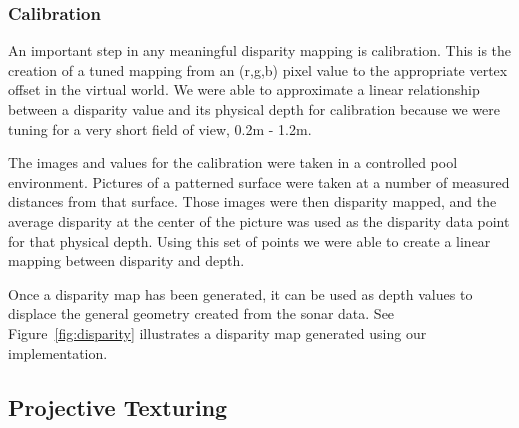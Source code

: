 \documentclass[a4paper,twoside]{article}
\begin{document}
\subsubsection{Calibration}
\label{subsec:calibration}

An important step in any meaningful disparity mapping is calibration.
This is the creation of a tuned mapping from an (r,g,b) pixel value to the appropriate vertex offset in the virtual world. 
We were able to approximate a linear relationship between a disparity value and its physical depth for calibration because we were tuning for a very short field of view, 0.2m - 1.2m.

The images and values for the calibration were taken in a controlled pool environment.  
Pictures of a patterned surface were taken at a number of measured distances from that surface. 
Those images were then disparity mapped, and the average disparity at the center of the picture was used as the disparity data point for that physical depth.
Using this set of points we were able to create a linear mapping between disparity and depth.


Once a disparity map has been generated, it can be used as depth values to displace the general geometry created from the sonar data. See Figure~\ref{fig:disparity} illustrates a disparity map generated using our implementation.


\subsection{Projective Texturing}
\label{subsec:projectiveTexturing}



\end{document}
